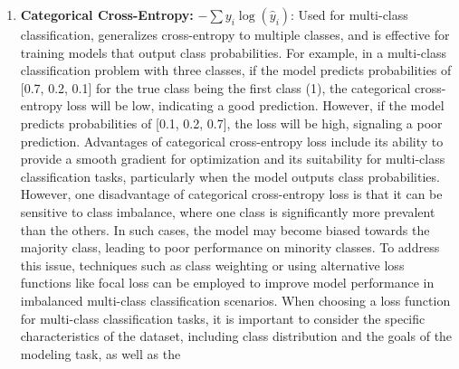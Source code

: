 \documentclass[
  letterpaper,
  DIV=11,
  numbers=noendperiod]{scrreprt}
\begin{document}
\begin{enumerate}
  classification tasks, it is important to consider the specific
  characteristics of the dataset, including class distribution and the
  goals of the modeling task, as well as the trade-offs between
  optimization efficiency and sensitivity to class imbalance. Its major
  disadvantage is that it can be sensitive to class imbalance, where one
  class is significantly more prevalent than the other. In such cases,
  the model may become biased towards the majority class, leading to
  poor performance on the minority class. To address this issue,
  techniques such as class weighting or using alternative loss functions
  like focal loss can be employed to improve model performance in
  imbalanced classification scenarios. When choosing a loss function for
  classification tasks, it is important to consider the specific
  characteristics of the dataset, including class distribution and the
  goals of the modeling task, as well as the trade-offs between
  optimization efficiency and sensitivity to class imbalance.
\item
  \textbf{Categorical Cross-Entropy:} \(-\sum y_i \log(\hat{y}_i)\):
  Used for multi-class classification, generalizes cross-entropy to
  multiple classes, and is effective for training models that output
  class probabilities. For example, in a multi-class classification
  problem with three classes, if the model predicts probabilities of
  {[}0.7, 0.2, 0.1{]} for the true class being the first class (1), the
  categorical cross-entropy loss will be low, indicating a good
  prediction. However, if the model predicts probabilities of {[}0.1,
  0.2, 0.7{]}, the loss will be high, signaling a poor prediction.
  Advantages of categorical cross-entropy loss include its ability to
  provide a smooth gradient for optimization and its suitability for
  multi-class classification tasks, particularly when the model outputs
  class probabilities. However, one disadvantage of categorical
  cross-entropy loss is that it can be sensitive to class imbalance,
  where one class is significantly more prevalent than the others. In
  such cases, the model may become biased towards the majority class,
  leading to poor performance on minority classes. To address this
  issue, techniques such as class weighting or using alternative loss
  functions like focal loss can be employed to improve model performance
  in imbalanced multi-class classification scenarios. When choosing a
  loss function for multi-class classification tasks, it is important to
  consider the specific characteristics of the dataset, including class
  distribution and the goals of the modeling task, as well as the

\end{enumerate}
\end{document}
